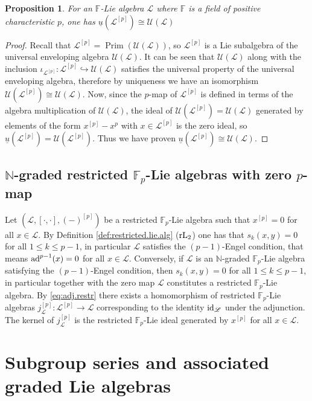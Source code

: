 \documentclass{amsart}
\theoremstyle{plain}
\newtheorem{prop}{Proposition}
\theoremstyle{definition}
\numberwithin{theorem}{section}
\numberwithin{equation}{section}
\newcommand{\LL}{\mathscr{L}}
\newcommand{\Univ}{\mathscr{U}}
\newcommand{\rUniv}{\underline{{u}}}
\newcommand{\Prim}{\operatorname{Prim}}
\newcommand{\FF}{\mathbb{F}}
\begin{document}
\begin{prop}
    For an $\FF$-Lie algebra $\LL$ where $\FF$ is a field of positive characteristic $p$, one has $\rUniv(\LL^{[p]}) \cong \Univ(\LL)$
\end{prop}
\begin{proof}  
    Recall that $\LL^{[p]} = \Prim(\Univ(\LL))$, so $\LL^{[p]}$ is a Lie subalgebra of the universal enveloping algebra $\Univ(\LL)$. It can be seen that $\Univ(\LL)$ along with the inclusion $\iota_{\LL^{[p]}} : \LL^{[p]} \hookrightarrow \Univ(\LL)$ satisfies the universal property of the universal enveloping algebra, therefore by uniqueness we have an isomorphism $\Univ(\LL^{[p]}) \cong \Univ(\LL)$. Now, since the $p$-map of $\LL^{[p]}$ is defined in terms of the algebra multiplication of $\Univ(\LL)$, the ideal of $\Univ(\LL^{[p]}) = \Univ(\LL)$ generated by elements of the form $x^{[p]} - x^p$ with $x \in \LL^{[p]}$ is the zero ideal, so $\rUniv(\LL^{[p]}) =  \Univ(\LL^{[p]})$. Thus we have proven $\rUniv(\LL^{[p]}) \cong \Univ(\LL)$.
\end{proof}

\subsection{$\mathbb N$-graded restricted $\FF_p$-Lie algebras with zero $p$-map}\label{section 2.3}
Let $(\LL, [\cdot,\cdot], (-)^{[p]})$ be a restricted $\FF_p$-Lie algebra such that $x^{[p]} = 0$ for all $x \in \LL$. By Definition \ref{def:restricted.lie.alg} (${\rm rL}_2$) one has that $s_k(x, y) = 0$ for all $1 \leq k \leq p-1$, in particular $\LL$ satisfies the $(p-1)$-Engel condition, that means ${\rm ad}^{p-1}(x) = 0$ for all $x \in \LL$. Conversely, if $\LL$ is an $\mathbb N$-graded $\FF_p$-Lie algebra satisfying the $(p-1)$-Engel condition, then $s_k(x, y) = 0$ for all $1 \leq k \leq p-1$, in particular together with the zero map $\LL$ constitutes a restricted $\FF_p$-Lie algebra.
\noindent
By \eqref{eq:adj.restr} there exists a homomorphism of restricted $\FF_p$-Lie algebras $j_\LL^{[p]} : \LL^{[p]} \to \LL$ corresponding to the identity ${\rm id}_\LL$ under the adjunction. The kernel of $j_\LL^{[p]}$ is the restricted $\FF_p$-Lie ideal generated by $x^{[p]}$ for all $x \in \LL$. 

\section{Subgroup series and associated graded Lie algebras}
\end{document}
